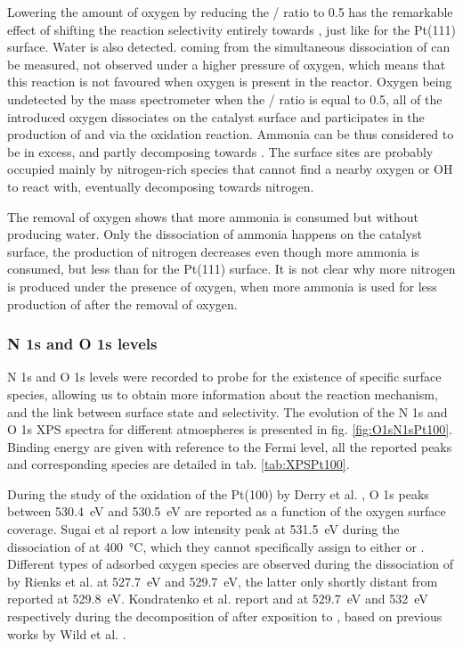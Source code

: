 Lowering the amount of oxygen by reducing the / ratio to \num{0.5} has the remarkable effect of shifting the reaction selectivity entirely towards , just like for the Pt(111) surface.
Water is also detected.
 coming from the simultaneous dissociation of  can be measured, not observed under a higher pressure of oxygen, which means that this reaction is not favoured when oxygen is present in the reactor.
Oxygen being undetected by the mass spectrometer when the / ratio is equal to \num{0.5}, all of the introduced oxygen dissociates on the catalyst surface and participates in the production of  and  via the oxidation reaction.
Ammonia can be thus considered to be in excess, and partly decomposing towards .
The surface sites are probably occupied mainly by nitrogen-rich species that cannot find a nearby oxygen or OH to react with, eventually decomposing towards nitrogen.

The removal of oxygen shows that more ammonia is consumed but without producing water.
Only the dissociation of ammonia happens on the catalyst surface, the production of nitrogen decreases even though more ammonia is consumed, but less than for the Pt(111) surface.
It is not clear why more nitrogen is produced under the presence of oxygen, when more ammonia is used for less production of  after the removal of oxygen.

\subsubsection{N 1s and O 1s levels}

N 1s and O 1s levels were recorded to probe for the existence of specific surface species, allowing us to obtain more information about the reaction mechanism, and the link between surface state and selectivity.
The evolution of the N 1s and O 1s XPS spectra for different atmospheres is presented in fig. \ref{fig:O1sN1sPt100}.
Binding energy are given with reference to the Fermi level, all the reported peaks and corresponding species are detailed in tab. \ref{tab:XPSPt100}.

During the study of the oxidation of the Pt(100) by Derry et al. \parencite*{Derry1984}, O 1s peaks between \qty{530.4}{\eV} and \qty{530.5}{\eV} are reported as a function of the oxygen surface coverage.
Sugai et al \parencite*{Sugai1993} report a low intensity peak at \qty{531.5}{\eV} during the dissociation of  at \qty{400}{\degreeCelsius}, which they cannot specifically assign to either  or .
Different types of adsorbed oxygen species are observed during the dissociation of  by Rienks et al. \parencite*{Rienks2003} at \qty{527.7}{\eV} and \qty{529.7}{\eV}, the latter only shortly distant from  reported at \qty{529.8}{\eV}.
Kondratenko et al. \parencite*{Kondratenko2006} report  and  at \qty{529.7}{\eV} and \qty{532}{\eV} respectively during the decomposition of  after exposition to , based on previous works by Wild et al. \parencite*{Wild2000}.

